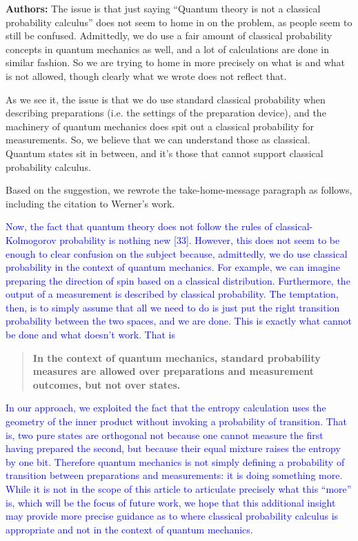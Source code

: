 \documentclass[11pt, executivepaper]{article}
\begin{document}
\begin{enumerate}
\textbf{Authors:} The issue is that just saying “Quantum theory is not a classical probability calculus” does not seem to home in on the problem, as people seem to still be confused. Admittedly, we do use a fair amount of classical probability concepts in quantum mechanics as well, and a lot of calculations are done in similar fashion. So we are trying to home in more precisely on what is and what is not allowed, though clearly what we wrote does not reflect that.

As we see it, the issue is that we do use standard classical probability when describing preparations (i.e. the settings of the preparation device), and the machinery of quantum mechanics does spit out a classical probability for measurements. So, we believe that we can understand those as classical. Quantum states sit in between, and it's those that cannot support classical probability calculus.

Based on the suggestion, we rewrote the take-home-message paragraph as follows, including the citation to Werner's work.

\textcolor{blue} {
	Now, the fact that quantum theory does not follow the rules of classical-Kolmogorov probability is nothing new [33]. However, this does not seem to be enough to clear confusion on the subject because, admittedly, we do use classical probability in the context of quantum mechanics. For example, we can imagine preparing the direction of spin based on a classical distribution. Furthermore, the output of a measurement is described by classical probability. The temptation, then, is to simply assume that all we need to do is just put the right transition probability between the two spaces, and we are done. This is exactly what cannot be done and what doesn't work. That is
	\begin{quote}
		\textbf{In the context of quantum mechanics, standard probability measures are allowed over preparations and measurement outcomes, but not over states.}
	\end{quote}
	In our approach, we exploited the fact that the entropy calculation uses the geometry of the inner product without invoking a probability of transition. That is, two pure states are orthogonal not because one cannot measure the first having prepared the second, but because their equal mixture raises the entropy by one bit. Therefore quantum mechanics is not simply defining a probability of transition between preparations and measurements: it is doing something more. While it is not in the scope of this article to articulate precisely what this ``more'' is, which will be the focus of future work, we hope that this additional insight may provide more precise guidance as to where classical probability calculus is appropriate and not in the context of quantum mechanics.	
}
	

\end{enumerate}
\end{document}
